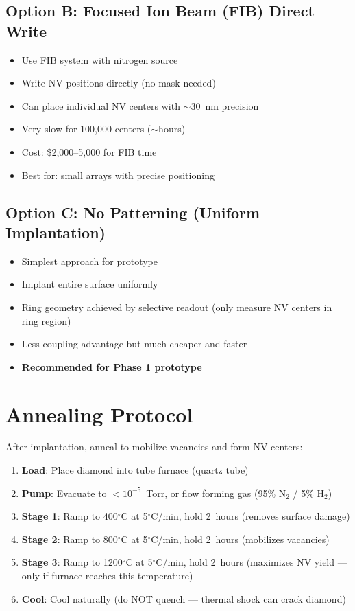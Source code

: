 \documentclass[11pt,a4paper,openany]{book}
\begin{document}
\subsection{Option B: Focused Ion Beam (FIB) Direct Write}

\begin{itemize}[nosep]
  \item Use FIB system with nitrogen source
  \item Write NV positions directly (no mask needed)
  \item Can place individual NV centers with ${\sim}30$~nm precision
  \item Very slow for 100,000 centers (${\sim}$hours)
  \item Cost: \$2,000--5,000 for FIB time
  \item Best for: small arrays with precise positioning
\end{itemize}

\subsection{Option C: No Patterning (Uniform Implantation)}

\begin{itemize}[nosep]
  \item Simplest approach for prototype
  \item Implant entire surface uniformly
  \item Ring geometry achieved by selective readout (only measure NV centers in ring region)
  \item Less coupling advantage but much cheaper and faster
  \item \textbf{Recommended for Phase 1 prototype}
\end{itemize}

\section{Annealing Protocol}

After implantation, anneal to mobilize vacancies and form NV centers:

\begin{enumerate}[nosep]
  \item \textbf{Load}: Place diamond into tube furnace (quartz tube)
  \item \textbf{Pump}: Evacuate to $< 10^{-5}$~Torr, or flow forming gas (95\% N$_2$ / 5\% H$_2$)
  \item \textbf{Stage 1}: Ramp to 400$^\circ$C at 5$^\circ$C/min, hold 2~hours (removes surface damage)
  \item \textbf{Stage 2}: Ramp to 800$^\circ$C at 5$^\circ$C/min, hold 2~hours (mobilizes vacancies)
  \item \textbf{Stage 3}: Ramp to 1200$^\circ$C at 5$^\circ$C/min, hold 2~hours (maximizes NV yield --- only if furnace reaches this temperature)
  \item \textbf{Cool}: Cool naturally (do NOT quench --- thermal shock can crack diamond)
\end{enumerate}
\end{document}
